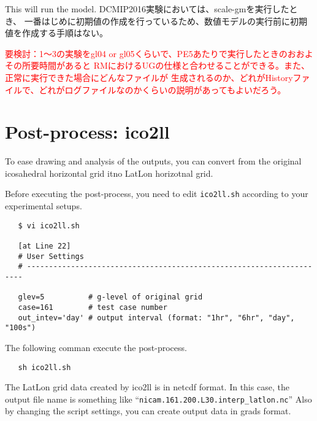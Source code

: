 This will run the model.
DCMIP2016実験においては、scale-gmを実行したとき、
一番はじめに初期値の作成を行っているため、数値モデルの実行前に初期値を作成する手順はない。

\textcolor{red}{要検討：1〜3の実験をgl04 or gl05くらいで、PE5あたりで実行したときのおおよその所要時間があると
 RMにおけるUGの仕様と合わせることができる。また、正常に実行できた場合にどんなファイルが
 生成されるのか、どれがHistoryファイルで、どれがログファイルなのかくらいの説明があってもよいだろう。}



\section{Post-process: ico2ll}
To ease drawing and analysis of the outputs, you can convert
from the original icosahedral horizontal grid itno LatLon horizotnal grid.

Before executing the post-process, you need to edit \verb|ico2ll.sh|
according to your experimental setups.
 \begin{verbatim}
   $ vi ico2ll.sh

   [at Line 22]
   # User Settings
   # ---------------------------------------------------------------------

   glev=5          # g-level of original grid
   case=161        # test case number
   out_intev='day' # output interval (format: "1hr", "6hr", "day", "100s")
 \end{verbatim}

 \noindent The following comman execute the post-process.
 \begin{verbatim}
   sh ico2ll.sh
 \end{verbatim}

 \noindent The LatLon grid data created by ico2ll is in netcdf format.
In this case, the output file name is something like
``\verb|nicam.161.200.L30.interp_latlon.nc|''
Also by changing the script settings, you can create output data in
grads format.
